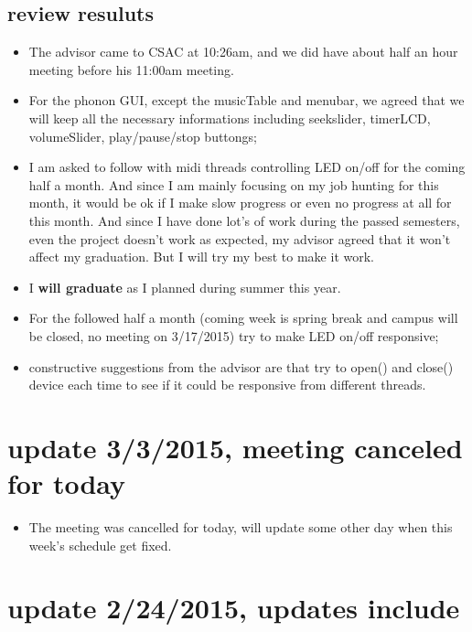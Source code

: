 \documentclass[9pt,b5paper]{article}
\begin{document}
\subsection{review resuluts}
\label{sec-2-4}
\begin{itemize}
\item The advisor came to CSAC at 10:26am, and we did have about half an hour meeting before his 11:00am meeting.
\item For the phonon GUI, except the musicTable and menubar, we agreed that we will keep all the necessary informations including seekslider, timerLCD, volumeSlider, play/pause/stop buttongs;
\item I am asked to follow with midi threads controlling LED on/off for the coming half a month. And since I am mainly focusing on my job hunting for this month, it would be ok if I make slow progress or even no progress at all for this month. And since I have done lot's of work during the passed semesters, even the project doesn't work as expected, my advisor agreed that it won't affect my graduation. But I will try my best to make it work.
\item I \textbf{will graduate} as I planned during summer this year.
\item For the followed half a month (coming week is spring break and campus will be closed, no meeting on 3/17/2015) try to make LED on/off responsive;
\item constructive suggestions from the advisor are that try to open() and close() device each time to see if it could be responsive from different threads.
\end{itemize}

\section{update 3/3/2015, meeting canceled for today}
\label{sec-3}
\begin{itemize}
\item The meeting was cancelled for today, will update some other day when this week's schedule get fixed.
\end{itemize}
\section{update 2/24/2015, updates include}
\label{sec-4}
\end{document}
